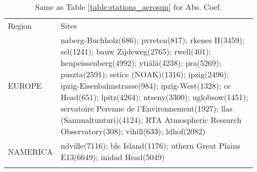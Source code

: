 \documentclass[journal abbreviation, manuscript]{copernicus}
\begin{document}
\clearpage

\begin{table}
 \tiny
 \begin{tabularx}{\textwidth}{lX}
  \tophline
  Region   & Sites                                                                                                                                                                                                                                                                                                                                                                                                                                                                                                                                                                                                                                                                                                                                                                                                                                                               \\
\middlehline
   EUROPE &  naberg-Buchholz(686); pvreten(817); rkenes II(3459); sel(1241); bauw Zijdeweg(2765); rwell(401); henpeissenberg(4992); ytiälä(4238); pra(5269); puszta(2591); setice (NOAK)(1316); ipzig(2496); ipzig-Eisenbahnstrasse(984); ipzig-West(1328); ce Head(651); lpitz(4264); ntseny(3300); uglobsow(1451); servatoire Perenne de l'Environnement(1927); llas (Sammaltunturi)(4124); RTA Atmospheric Research Observatory(308); vihill(633); ldhof(2082) \\
 NAMERICA &                                                                                                                                                                                                                                                                                                                                                                     ndville(7116); ble Island(1176); uthern Great Plains E13(6649); inidad Head(5049) \\
\bottomhline
 \end{tabularx}
 \caption{Same as Table \ref{table:stations_aerosun} for Abs. Coef.}
 \label{table:stations_abs}
\end{table}
\end{document}
